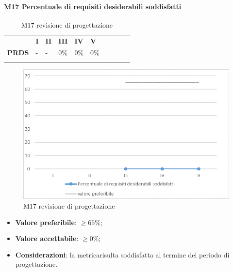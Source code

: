 \paragraph{M17 Percentuale di requisiti desiderabili soddisfatti} \mbox{}
\begin{longtable}[H!] {						
		>{}p{50mm}  		
		>{}p{8mm}
		>{}p{8mm}		
		>{}p{8mm}		
		>{}p{8mm}		
		>{}p{8mm}		
		>{}p{8mm}
		>{}p{8mm}
		>{}p{8mm}
		>{}p{8mm}
	}
	\rowcolor{gray!50}
	\textbf{} & \textbf{I} & \textbf{II} & \textbf{III} & \textbf{IV} & \textbf{V} \TBstrut \\ [2mm]
	\textbf{PRDS} & - & - & 0\% & 0\% & 0\% \TBstrut \\ [2mm]
	\rowcolor{white}
	\caption{M17 revisione di progettazione\glo}
\end{longtable}
\begin{figure}[H] 	
\includegraphics[width=\linewidth]{./img/grafici/RP14.png}	
\caption{M17 revisione di progettazione\glo}	
\end{figure}
\begin{itemize}
	\item \textbf{Valore preferibile}: $\ge 65\%$;
	\item \textbf{Valore accettabile}: $\ge 0\%$;
	\item \textbf{Considerazioni}: la metrica\glosp risulta soddisfatta al termine del periodo di progettazione\glo.
\end{itemize}
